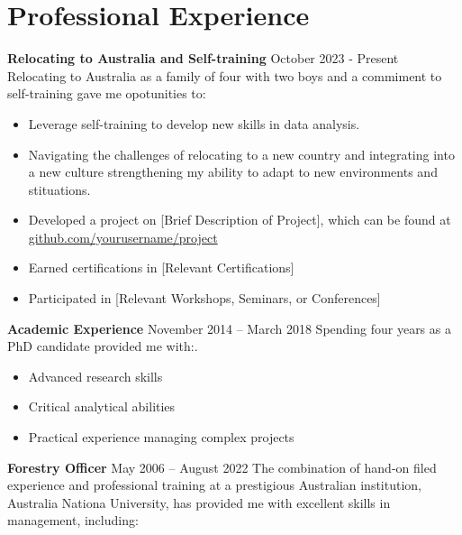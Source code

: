\documentclass[a4paper,12pt]{article}
\begin{document}
\section*{Professional Experience}

\vspace{1em} %
\noindent
\textbf{Relocating to Australia and Self-training} \hfill October 2023 - Present \newline
Relocating to Australia as a family of four with two boys and a commiment to self-training gave me opotunities to: \newline

\vspace{-1.5em} %
\begin{itemize}
    \item Leverage self-training to develop new skills in data analysis.
    \item Navigating the challenges of relocating to a new country and integrating into a new culture strengthening my ability to adapt to new environments and stituations.
    \item Developed a project on [Brief Description of Project], which can be found at \href{https://github.com/yourusername/project}{github.com/yourusername/project}
    \item Earned certifications in [Relevant Certifications]
    \item Participated in [Relevant Workshops, Seminars, or Conferences]
\end{itemize}

\vspace{1em} %
\noindent
\textbf{Academic Experience} \hfill November 2014 -- March 2018 \newline
Spending four years as a PhD candidate provided me with:. \newline
\vspace{-1.5em} %
\begin{itemize}
    \item Advanced research skills
    \item Critical analytical abilities
    \item Practical experience managing complex projects
\end{itemize}

\vspace{1em} %
\noindent
\textbf{Forestry Officer} \hfill May 2006 -- August 2022 \newline
The combination of hand-on filed experience and professional training at a prestigious Australian institution, Australia Nationa University, has provided me with excellent skills in management, including:\newline
\end{document}
